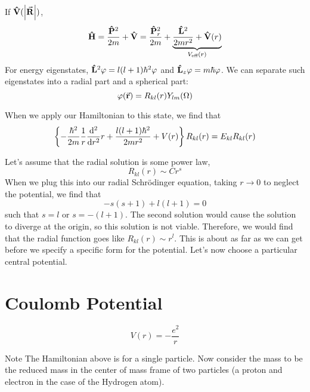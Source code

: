 \documentclass[a4paper,twoside,master.tex]{subfiles}
\begin{document}

If $ \vu{V}(\abs{ \va{R}}) $,
\begin{equation}
    \vu{H} = \frac{ \vu{P}^2}{2m} + \vu{V} = \frac{ \vu{P}_r^2}{2m} + \underbrace{\frac{ \vu{L}^2}{2mr^2} + \vu{V}(r)}_{V_{\text{eff}}(r)}
\end{equation}
For energy eigenstates, $ \vu{L}^2 \varphi = l(l+1) \hbar^2 \varphi $ and $ \vu{L}_z \varphi = m \hbar \varphi $. We can separate such eigenstates into a radial part and a spherical part:
\begin{equation}
    \varphi( \va{r}) = R_{kl}(r) Y_{lm}(\Omega)
\end{equation}

When we apply our Hamiltonian to this state, we find that
\begin{equation}
    \left\{- \frac{\hbar^2}{2m} \frac{1}{r} \dv[2]{r}r + \frac{l(l+1) \hbar^2}{2mr^2} + V(r)\right\} R_{kl}(r) = E_{kl} R_{kl}(r)
\end{equation}

Let's assume that the radial solution is some power law,
\begin{equation}
    R_{kl}(r) \sim Cr^s
\end{equation}
When we plug this into our radial Schr\"odinger equation, taking $ r \to 0 $ to neglect the potential, we find that
\begin{equation}
    -s(s+1) + l(l+1) = 0
\end{equation}
such that $ s = l $ or $ s = -(l+1) $. The second solution would cause the solution to diverge at the origin, so this solution is not viable. Therefore, we would find that the radial function goes like $ R_{kl}(r) \sim r^l $. This is about as far as we can get before we specify a specific form for the potential. Let's now choose a particular central potential.

\section{Coulomb Potential}
\label{sec:coulomb_potential}

\begin{equation}
    V(r) = - \frac{e^2}{r}
\end{equation}

\begin{note}{Note}
    The Hamiltonian above is for a single particle. Now consider the mass to be the reduced mass in the center of mass frame of two particles (a proton and electron in the case of the Hydrogen atom).
\end{note}
\end{document}
